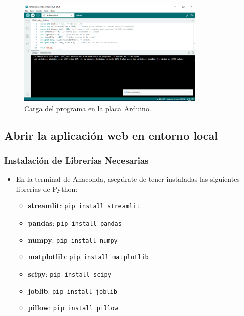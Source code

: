 \begin{figure}[h]
    \centering
    \includegraphics[width=0.8\textwidth]{img/arduino.png}
    \caption{Carga del programa en la placa Arduino.}
    \label{fig:arduino}
\end{figure}

\subsection{Abrir la aplicación web en entorno local}

\subsubsection{Instalación de Librerías Necesarias}
\begin{itemize}
    \item En la terminal de Anaconda, asegúrate de tener instaladas las siguientes librerías de Python:
     \begin{itemize}
            \item \textbf{streamlit}: \texttt{pip install streamlit}
            \item \textbf{pandas}: \texttt{pip install pandas}
            \item \textbf{numpy}: \texttt{pip install numpy}
            \item \textbf{matplotlib}: \texttt{pip install matplotlib}
            \item \textbf{scipy}: \texttt{pip install scipy}
            \item \textbf{joblib}: \texttt{pip install joblib}
            \item \textbf{pillow}: \texttt{pip install pillow}
        \end{itemize}
\end{itemize}

